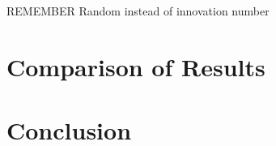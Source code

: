 \documentclass[twocolumn]{article}
\begin{document}
REMEMBER
Random instead of innovation number


\section{Comparison of Results}


\section{Conclusion}




\end{document}
